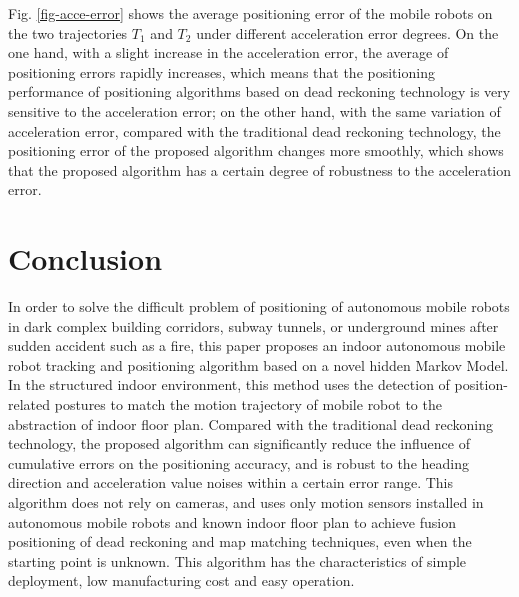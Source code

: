 \documentclass{llncs}
\begin{document}
Fig. \ref{fig-acce-error} shows the average positioning error of the mobile robots on the two trajectories $T_1$ and $T_2$ under different acceleration error degrees. On the one hand, with a slight increase in the acceleration error, the average of positioning errors rapidly increases, which means that the positioning performance of positioning algorithms based on dead reckoning technology is very sensitive to the acceleration error; on the other hand, with the same variation of acceleration error, compared with the traditional dead reckoning technology, the positioning error of the proposed algorithm changes more smoothly, which shows that the proposed algorithm has a certain degree of robustness to the acceleration error.
 

\section{Conclusion}

In order to solve the difficult problem of positioning of autonomous mobile robots in dark complex building corridors, subway tunnels, or underground mines after sudden accident such as a fire, this paper proposes an indoor autonomous mobile robot tracking and positioning algorithm based on a novel hidden Markov Model. In the structured indoor environment, this method uses the detection of position-related postures to match the motion trajectory of mobile robot to the abstraction of indoor floor plan. Compared with the traditional dead reckoning technology, the proposed algorithm can significantly reduce the influence of cumulative errors on the positioning accuracy, and is robust to the heading direction and acceleration value noises within a certain error range. This algorithm does not rely on cameras, and uses only motion sensors installed in autonomous mobile robots and known indoor floor plan to achieve fusion positioning of dead reckoning and map matching techniques, even when the starting point is unknown. This algorithm has the characteristics of simple deployment, low manufacturing cost and easy operation.

%
%

%
%
%

\end{document}
